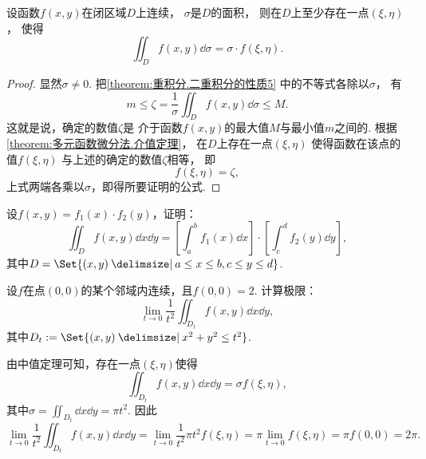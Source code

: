 \begin{property}[二重积分的中值定理]\label{theorem:重积分.二重积分的中值定理}
设函数\(f(x,y)\)在闭区域\(D\)上连续，
\(\sigma\)是\(D\)的面积，
则在\(D\)上至少存在一点\((\xi,\eta)\)，
使得\begin{equation*}
	\iint_D f(x,y) \dd{\sigma} = \sigma \cdot f(\xi,\eta).
\end{equation*}
\begin{proof}
显然\(\sigma\neq0\).
把\cref{theorem:重积分.二重积分的性质5} 中的不等式各除以\(\sigma\)，
有\begin{equation*}
	m
	\leq
	\zeta = \frac{1}{\sigma} \iint_D f(x,y) \dd{\sigma}
	\leq
	M.
\end{equation*}
这就是说，确定的数值\(\zeta\)是
介于函数\(f(x,y)\)的最大值\(M\)与最小值\(m\)之间的.
根据\cref{theorem:多元函数微分法.介值定理}，
在\(D\)上存在一点\((\xi,\eta)\)
使得函数在该点的值\(f(\xi,\eta)\)
与上述的确定的数值\(\zeta\)相等，
即\begin{equation*}
	f(\xi,\eta) = \zeta,
\end{equation*}
上式两端各乘以\(\sigma\)，即得所要证明的公式.
\end{proof}
\end{property}

\begin{example}
设\(f(x,y) = f_1(x) \cdot f_2(y)\)，证明：\begin{equation*}
	\iint_D f(x,y) \dd{x} \dd{y}
	= \left[ \int_a^b f_1(x) \dd{x} \right] \cdot \left[ \int_c^d f_2(y) \dd{y} \right],
\end{equation*}
其中\(D = \Set{(x,y) \given a \leq x \leq b, c \leq y \leq d}\).
\end{example}

\begin{example}
设\(f\)在点\((0,0)\)的某个邻域内连续，且\(f(0,0) = 2\).
计算极限：\begin{equation*}
	\lim_{t \to 0} \frac{1}{t^2} \iint_{D_t} f(x,y) \dd{x} \dd{y},
\end{equation*}
其中\(D_t \defeq \Set{(x,y) \given x^2 + y^2 \leq t^2}\).
\begin{solution}
由中值定理可知，存在一点\((\xi,\eta)\)使得\begin{equation*}
	\iint_{D_t} f(x,y) \dd{x} \dd{y}
	= \sigma f(\xi,\eta),
\end{equation*}
其中\(\sigma = \iint_{D_t} \dd{x} \dd{y} = \pi t^2\).
因此\begin{equation*}
	\lim_{t \to 0} \frac{1}{t^2} \iint_{D_t} f(x,y) \dd{x} \dd{y}
	= \lim_{t \to 0} \frac{1}{t^2} \pi t^2 f(\xi,\eta)
	= \pi \lim_{t \to 0} f(\xi,\eta)
	= \pi f(0,0)
	= 2\pi.
\end{equation*}
\end{solution}
\end{example}

